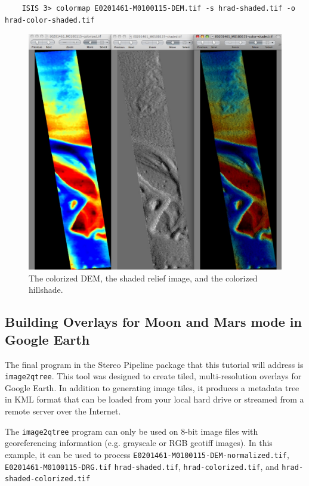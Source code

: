 \begin{verbatim}
    ISIS 3> colormap E0201461-M0100115-DEM.tif -s hrad-shaded.tif -o hrad-color-shaded.tif
\end{verbatim}

\begin{figure}
\begin{center}
\includegraphics[width=5in]{images/p19-colorized-shaded.png}
\caption[Hrad colorized and shaded relief]{
    \label{hrad-color}
	The colorized DEM, the shaded relief image, and the colorized hillshade.
    }
\end{center}
\end{figure}

\subsection{Building Overlays for Moon and Mars mode in Google Earth}

The final program in the Stereo Pipeline package that this tutorial
will address is \texttt{image2qtree}.  This tool was designed to
create tiled, multi-resolution overlays for Google Earth.  In addition
to generating image tiles, it produces a metadata tree in KML format
that can be loaded from your local hard drive or streamed from a
remote server over the Internet.  

The \texttt{image2qtree} program can only be used on 8-bit image files
with georeferencing information (e.g. grayscale or RGB geotiff
images). In this example, it can be used to process
\texttt{E0201461-M0100115-DEM-normalized.tif},
\texttt{E0201461-M0100115-DRG.tif} \texttt{hrad-shaded.tif},
\texttt{hrad-colorized.tif}, and \texttt{hrad-shaded-colorized.tif}


